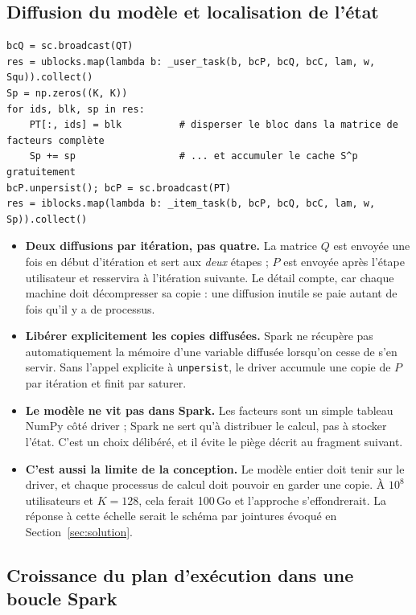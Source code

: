 \documentclass[11pt,a4paper]{article}
\begin{document}
\subsection{Diffusion du modèle et localisation de l'état}

\begin{lstlisting}[caption={\texttt{eals\_rdd.fit} - le corps d'une itération.},label={lst:iter}]
bcQ = sc.broadcast(QT)
res = ublocks.map(lambda b: _user_task(b, bcP, bcQ, bcC, lam, w, Squ)).collect()
Sp = np.zeros((K, K))
for ids, blk, sp in res:
    PT[:, ids] = blk          # disperser le bloc dans la matrice de facteurs complète
    Sp += sp                  # ... et accumuler le cache S^p gratuitement
bcP.unpersist(); bcP = sc.broadcast(PT)
res = iblocks.map(lambda b: _item_task(b, bcP, bcQ, bcC, lam, w, Sp)).collect()
\end{lstlisting}

\begin{itemize}\itemsep3pt
\item \textbf{Deux diffusions par itération, pas quatre.} La matrice $Q$ est envoyée une
fois en début d'itération et sert aux \emph{deux} étapes ; $P$ est envoyée après l'étape
utilisateur et resservira à l'itération suivante. Le détail compte, car chaque machine
doit décompresser sa copie : une diffusion inutile se paie autant de fois qu'il y a de
processus.
\item \textbf{Libérer explicitement les copies diffusées.} Spark ne récupère pas
automatiquement la mémoire d'une variable diffusée lorsqu'on cesse de s'en servir. Sans
l'appel explicite à \texttt{unpersist}, le driver accumule une copie de $P$ par
itération et finit par saturer.
\item \textbf{Le modèle ne vit pas dans Spark.} Les facteurs sont un simple tableau
NumPy côté driver ; Spark ne sert qu'à distribuer le calcul, pas à stocker l'état. C'est
un choix délibéré, et il évite le piège décrit au fragment suivant.
\item \textbf{C'est aussi la limite de la conception.} Le modèle entier doit tenir sur
le driver, et chaque processus de calcul doit pouvoir en garder une copie. À $10^8$
utilisateurs et $K=128$, cela ferait 100\,Go et l'approche s'effondrerait. La réponse à
cette échelle serait le schéma par jointures évoqué en Section~\ref{sec:solution}.
\end{itemize}

\subsection{Croissance du plan d'exécution dans une boucle Spark}\label{sec:lineage}
\end{document}
